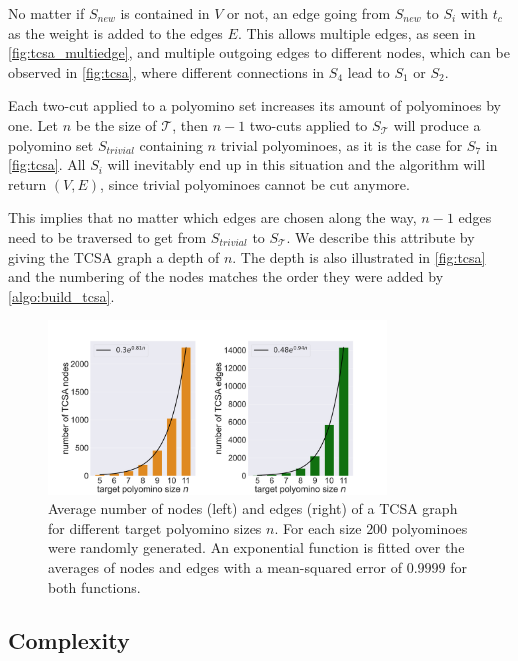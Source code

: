 No matter if $S_\textit{new}$ is contained in $V$ or not, an edge going from $S_\textit{new}$ to $S_i$ with $t_c$ as the weight is added to the edges $E$.
This allows multiple edges, as seen in \autoref{fig:tcsa_multiedge}, and multiple outgoing edges to different nodes, which can be observed in \autoref{fig:tcsa}, where different connections in $S_4$ lead to $S_1$ or $S_2$.

Each two-cut applied to a polyomino set increases its amount of polyominoes by one.
Let $n$ be the size of $\mathcal{T}$, then $n-1$ two-cuts applied to $S_\mathcal{T}$ will produce a polyomino set $S_\textit{trivial}$ containing $n$ trivial polyominoes, as it is the case for $S_7$ in \autoref{fig:tcsa}.
All $S_i$ will inevitably end up in this situation and the algorithm will return $(V,E)$, since trivial polyominoes cannot be cut anymore.

This implies that no matter which edges are chosen along the way, $n-1$ edges need to be traversed to get from $S_\textit{trivial}$ to $S_\mathcal{T}$.
We describe this attribute by giving the TCSA graph a depth of $n$.
The depth is also illustrated in \autoref{fig:tcsa} and the numbering of the nodes matches the order they were added by \autoref{algo:build_tcsa}.

\begin{figure}
	\centering
	\includegraphics[width=0.8\textwidth]{figures/plots/tcsa_nodes_edges.pdf}
	\caption[Average two-cut-sub-assembly nodes and edges for target size $n$]{Average number of nodes (left) and edges (right) of a TCSA graph for different target polyomino sizes $n$. For each size $200$ polyominoes were randomly generated. An exponential function is fitted over the averages of nodes and edges with a mean-squared error of $0.9999$ for both functions.}
	\label{fig:tcsa_plot}
\end{figure}

\subsection{Complexity}

